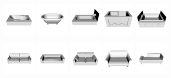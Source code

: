 \begin{figure}[!t]
	\includegraphics[width=0.15\textwidth]{Figures/ObjRecog/bathtub_0}\hfill
	\includegraphics[width=0.15\textwidth]{Figures/ObjRecog/bathtub_1}\hfill
	\includegraphics[width=0.15\textwidth]{Figures/ObjRecog/bathtub_2}\hfill
	\includegraphics[width=0.15\textwidth]{Figures/ObjRecog/bathtub_3}\hfill
	\includegraphics[width=0.15\textwidth]{Figures/ObjRecog/bathtub_4}\hfill

	\includegraphics[width=0.15\textwidth]{Figures/ObjRecog/sofa_0}\hfill
	\includegraphics[width=0.15\textwidth]{Figures/ObjRecog/sofa_1}\hfill
	\includegraphics[width=0.15\textwidth]{Figures/ObjRecog/sofa_2}\hfill
	\includegraphics[width=0.15\textwidth]{Figures/ObjRecog/sofa_3}\hfill
	\includegraphics[width=0.15\textwidth]{Figures/ObjRecog/sofa_4}\hfill


\end{figure}
